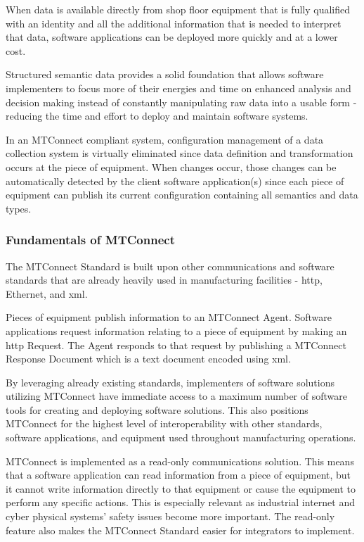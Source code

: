 When data is available directly from shop floor equipment that is fully qualified with an identity and all the  additional information that is needed to interpret that data, software applications can be deployed more quickly and at a lower cost.    

Structured semantic data provides a solid foundation that allows software implementers to focus more of their energies and time on enhanced analysis and decision making instead of constantly manipulating raw data into a usable form - reducing the time and effort to deploy and maintain software systems.  
 
In an MTConnect compliant system, configuration management of a data collection system is virtually eliminated since data definition and transformation occurs at the piece of equipment.   When changes occur, those changes can be automatically detected by the client software application(s) since each piece of equipment can publish its current configuration containing all semantics and data types.

\subsubsection{Fundamentals of MTConnect}

The MTConnect Standard is built upon other communications and software standards that are already heavily used in manufacturing facilities - \gls{http}, Ethernet, and \gls{xml}.
 
Pieces of equipment publish information to an MTConnect \gls{Agent}.  Software applications request information relating to a piece of equipment by making an \gls{http} Request. The \gls{Agent} responds to that request by publishing a MTConnect Response Document which is a text document encoded using \gls{xml}.   
 
By leveraging already existing standards, implementers of software solutions utilizing MTConnect have immediate access to a maximum number of software tools for creating and deploying software solutions.   This also positions MTConnect for the highest level of interoperability with other standards, software applications, and equipment used throughout manufacturing operations.    
 
MTConnect is implemented as a read-only communications solution.   This means that a software application can read information from a piece of equipment, but it cannot write information directly to that equipment or cause the equipment to perform any specific actions.  This is especially relevant as industrial internet and cyber physical systems' safety issues become more important.  The read-only feature also makes the MTConnect Standard easier for integrators to implement. 
 
